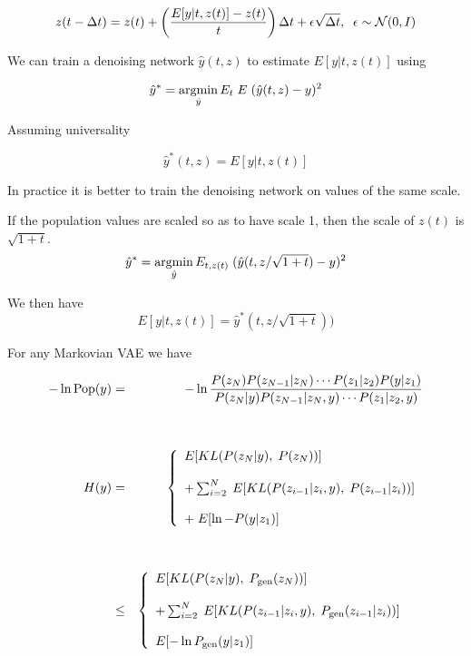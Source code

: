 {

$$z(t - \Delta t) = z(t) + \left(\frac{E[y|t,z(t)] - z(t)}{t}\right)\Delta t + \epsilon\sqrt{\Delta t},\;\;\epsilon \sim {\cal N}(0,I)$$

\vfill
We can train a denoising network $\hat{y}(t,z)$ to estimate $E[y|t,z(t)]$ using

\vfill
$$\hat{y}^* = \operatorname*{argmin}_{\hat{y}} E_t \;E \;(\hat{y}(t,z) - y)^2$$

\vfill
Assuming universality

\vfill
$$\hat{y}^*(t,z) = E[y|t,z(t)]$$

In practice it is better to train the denoising network on values of the same scale.

\vfill
If the population values are scaled so as to have scale 1, then the scale of $z(t)$ is $\sqrt{1+t}$.
$$\hat{y}^* = \operatorname*{argmin}_{\hat{y}} E_{t,z(t)} \; (\hat{y}(t,z/\sqrt{1+t}) - y)^2$$

\vfill
We then have
$$E[y|t,z(t)] = \hat{y}^*(t,z/\sqrt{1+t}))$$



For any Markovian VAE we have

\vfill
{\Large
\begin{eqnarray}
  - \ln \mathrm{Pop}(y) & = & - \ln\frac{P(z_N)P(z_{N-1}|z_N)\cdots P(z_1|z_2)P(y|z_1)}{P(z_N|y)P(z_{N-1}|z_N,y)\cdots P(z_1|z_2,y)} \nonumber\\
  \nonumber \\
  \nonumber \\
  H(y) & = & \left\{\begin{array}{l} E[KL(P(z_N|y),\;P(z_N))] \\ \\ + \sum_{i=2}^N  \; E[KL(P(z_{i-1}|z_i,y),\;P(z_{i-1}|z_i))] \\ \\ +\;E[\ln -P(y|z_1)] \end{array}\right. \label{Markov-eq} \\
  \nonumber\\
  \nonumber\\
  & \leq & \left\{\begin{array}{l} E[KL(P(z_N|y),\;P_{\mathrm{gen}}(z_N))] \\ \\ + \sum_{i=2}^N  \; E[KL(P(z_{i-1}|z_i,y),\;P_{\mathrm{gen}}(z_{i-1}|z_i))] \\ \\ E[- \ln P_{\mathrm{gen}}(y|z_1)] \end{array}\right. \;\;\;~\label{Markov-ELBO}
\end{eqnarray}
}

}
